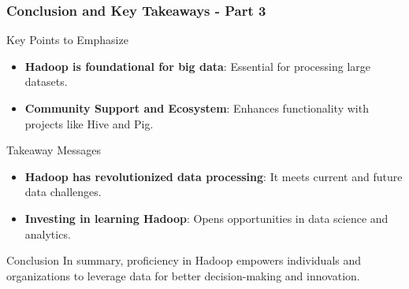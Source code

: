 \documentclass[aspectratio=169]{beamer}
\begin{document}
\begin{frame}[fragile]
    \frametitle{Conclusion and Key Takeaways - Part 3}
    \begin{block}{Key Points to Emphasize}
        \begin{itemize}
            \item \textbf{Hadoop is foundational for big data}: Essential for processing large datasets.
            \item \textbf{Community Support and Ecosystem}: Enhances functionality with projects like Hive and Pig.
        \end{itemize}
    \end{block}

    \begin{block}{Takeaway Messages}
        \begin{itemize}
            \item \textbf{Hadoop has revolutionized data processing}: It meets current and future data challenges.
            \item \textbf{Investing in learning Hadoop}: Opens opportunities in data science and analytics.
        \end{itemize}
    \end{block}
    
    \begin{block}{Conclusion}
        In summary, proficiency in Hadoop empowers individuals and organizations to leverage data for better decision-making and innovation.
    \end{block}
\end{frame}
\end{document}
